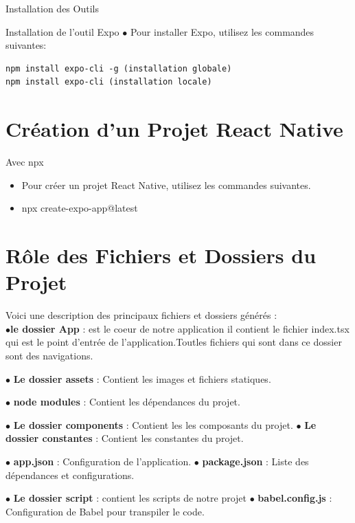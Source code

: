 \documentclass[5pt]{beamer}
\begin{document}
{\begin{frame}[fragile]{Installation des Outils}
\begin{block}{Installation de l’outil Expo}
$ \bullet $ Pour installer Expo, utilisez les commandes suivantes:
    \begin{lstlisting}
npm install expo-cli -g (installation globale)
npm install expo-cli (installation locale)
    \end{lstlisting}
	\end{block}
\end{frame}
\section{Création d’un Projet React Native}

\begin{frame}{Avec npx }
    \begin{itemize}
        \item Pour créer un projet React Native, utilisez les commandes suivantes.
        \item npx create-expo-app@latest
        
    \end{itemize}
       
\end{frame}


\section{Rôle des Fichiers et Dossiers du Projet}
\begin{frame}[fragile]{}
\begin{block}{}
Voici une description des principaux fichiers et dossiers générés :\\
$ \bullet $\textbf{le dossier App} : est le coeur de notre application il contient le fichier index.tsx qui est le point d’entrée de l’application.Toutles fichiers qui sont dans ce dossier sont des navigations.

$ \bullet $ \textbf{Le dossier assets }: Contient les images et fichiers statiques.

$ \bullet $  \textbf{node modules} : Contient les dépendances du projet.

 $ \bullet $ \textbf{Le dossier components} : Contient les les composants du
projet.
 $ \bullet $ \textbf{Le dossier constantes} : Contient les constantes du projet.
 
 
 $ \bullet $ \textbf{app.json} : Configuration de l’application.
 $ \bullet $ \textbf{ package.json }: Liste des dépendances et configurations.
 
 $ \bullet $\textbf{ Le dossier script} : contient les scripts de notre projet
 $ \bullet $\textbf{ babel.config.js }: Configuration de Babel pour transpiler le
code.
 

\end{block}
\end{frame}}
\end{document}
